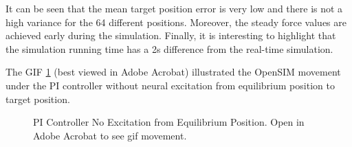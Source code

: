 It can be seen that the mean target position error is very low and there is not a high variance for the 64 different positions. Moreover, the steady force values are achieved early during the simulation. Finally, it is interesting to highlight that the simulation running time has a 2s difference from the real-time simulation. 

The GIF \ref{gif:PICONTROLLER2} (best viewed in Adobe Acrobat) illustrated the OpenSIM movement under the PI controller without neural excitation from equilibrium position to target position. 


\begin{figure}[h!]
    \centering
    \caption{PI Controller No Excitation from Equilibrium Position. Open in Adobe Acrobat to see gif movement.}
    \label{gif:PICONTROLLER2}

\end{figure}

\newpage
